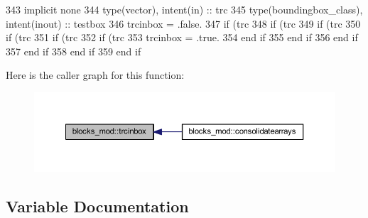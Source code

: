 \begin{DoxyCode}
343     \textcolor{keywordtype}{implicit none}
344     \textcolor{keywordtype}{type}(vector), \textcolor{keywordtype}{intent(in)} :: trc
345     \textcolor{keywordtype}{type}(boundingbox\_class), \textcolor{keywordtype}{intent(inout)} :: testbox
346     trcinbox = .false.
347     \textcolor{keywordflow}{if} (trc%
348         \textcolor{keywordflow}{if} (trc%
349             \textcolor{keywordflow}{if} (trc%
350                 \textcolor{keywordflow}{if} (trc%
351                     \textcolor{keywordflow}{if} (trc%
352                         \textcolor{keywordflow}{if} (trc%
353                             trcinbox = .true.
354 \textcolor{keywordflow}{                        end if}
355 \textcolor{keywordflow}{                    end if}
356 \textcolor{keywordflow}{                end if}
357 \textcolor{keywordflow}{            end if}
358 \textcolor{keywordflow}{        end if}
359 \textcolor{keywordflow}{    end if}
\end{DoxyCode}
Here is the caller graph for this function\+:\nopagebreak
\begin{figure}[H]
\begin{center}
\leavevmode
\includegraphics[width=350pt]{namespaceblocks__mod_ad8d92210b3d4ade090d2a19b97f4c88e_icgraph}
\end{center}
\end{figure}


\subsection{Variable Documentation}
\mbox{\label{namespaceblocks__mod_ac8ad6e3cf7a812f95dadb592336aca50}} 
